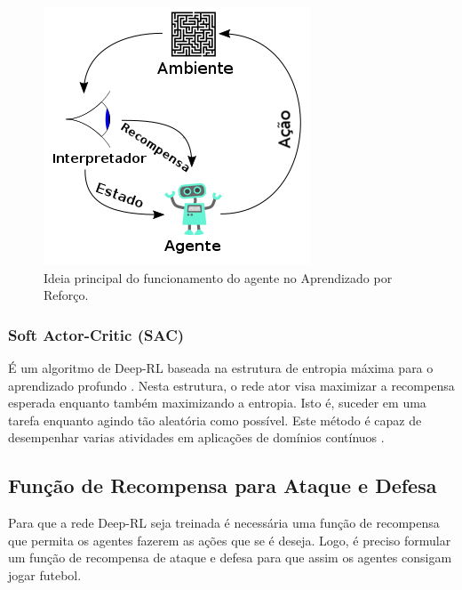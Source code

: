 \begin{figure}[htbp]
\centerline{\includegraphics[width=\columnwidth]{capitulos/imagens/reinforcement_learning.png}}
\caption{Ideia principal do funcionamento do agente no Aprendizado por Reforço.}
\label{fig:rl}
\end{figure}

\subsubsection{Soft Actor-Critic (SAC)}

É um algoritmo de Deep-RL baseada na estrutura de entropia máxima para o aprendizado profundo \cite{haarnoja2017reinforcement}.
Nesta estrutura, o rede ator visa maximizar a recompensa esperada enquanto também maximizando a entropia.
Isto é, suceder em uma tarefa enquanto agindo tão aleatória como possível.
Este método é capaz de desempenhar varias atividades em aplicações de domínios contínuos \cite{haarnoja2018soft}.

\subsection{Função de Recompensa para Ataque e Defesa}

Para que a rede Deep-RL seja treinada é necessária uma função de recompensa que permita os agentes fazerem as ações que se é deseja.
Logo, é preciso formular um função de recompensa de ataque e defesa para que assim os agentes consigam jogar futebol.

